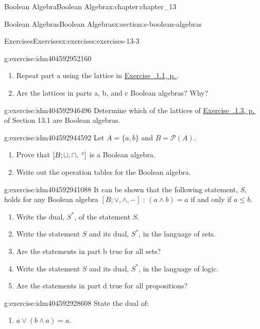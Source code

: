 \documentclass[twoside,10pt,]{book}
\newcommand{\xreffont}{\relax}
\numberwithin{equation}{section}
\begin{document}
\begin{chapterptx}{Boolean Algebra}{}{Boolean Algebra}{}{}{x:chapter:chapter_13}
\begin{sectionptx}{Boolean Algebras}{}{Boolean Algebras}{}{}{x:section:s-boolean-algebras}
\begin{exercises-subsection}{Exercises}{}{Exercises}{}{}{x:exercises:exercises-13-3}
\begin{divisionexercise}{2}{}{}{g:exercise:idm404592952160}
\begin{enumerate}[label=(\alph*)]
\item{}Repeat part a using the lattice in \hyperlink{x:exercise:exercise-13-1-1}{Exercise~{\xreffont 13.1.1.1}, p.\,\pageref{x:exercise:exercise-13-1-1}}.%
\item{}Are the lattices in parts a, b, and c Boolean algebras? Why?%
\end{enumerate}
%
\end{divisionexercise}%
\begin{divisionexercise}{3}{}{}{g:exercise:idm404592946496}%
Determine which of the lattices of \hyperlink{x:exercise:exercise-13-1-3}{Exercise~{\xreffont 13.1.1.3}, p.\,\pageref{x:exercise:exercise-13-1-3}} of Section 13.1 are Boolean algebras.%
\end{divisionexercise}%
\begin{divisionexercise}{4}{}{}{g:exercise:idm404592944592}%
Let \(A = \{a, b\}\) and \(B = \mathcal{P}(A)\).%
\begin{enumerate}[label=(\alph*)]
\item{}Prove that \([B; \cup, \cap, \hspace{1 mm}^c ]\) is a Boolean algebra.%
\item{}Write out the operation tables for the Boolean algebra.%
\end{enumerate}
%
\end{divisionexercise}%
\begin{divisionexercise}{5}{}{}{g:exercise:idm404592941088}%
It can be shown that the following statement, \(S\), holds for any Boolean algebra \([B; \lor , \land, -]\) : \((a \land  b) = a\) if and only if \(a \leq  b\).%
\begin{enumerate}[label=(\alph*)]
\item{}Write the dual, \(S^*\), of the statement \(S\).%
\item{}Write the statement \(S\) and its dual, \(S^*\), in the language of sets.%
\item{}Are the statements in part b true for all sets?%
\item{}Write the statement \(S\) and its dual, \(S^*\), in the language of logic.%
\item{}Are the statements in part d true for all propositions?%
\end{enumerate}
%
\end{divisionexercise}%
\begin{divisionexercise}{6}{}{}{g:exercise:idm404592928608}%
State the dual of:%
\begin{enumerate}[label=(\alph*)]
\item{}\(a \lor  (b \land  a) = a\).%

\end{enumerate}
\end{divisionexercise}
\end{exercises-subsection}
\end{sectionptx}
\end{chapterptx}
\end{document}

